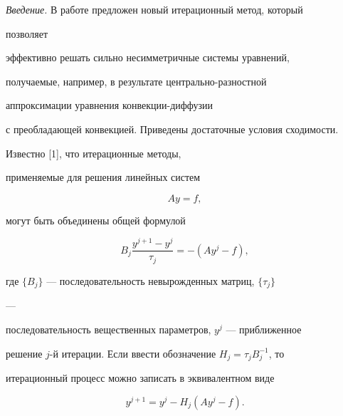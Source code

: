  




\maketitle 


\label{begin} 


 


{\it Введение.} В работе предложен новый итерационный метод, который 


позволяет  


эффективно решать сильно несимметричные системы уравнений, 


получаемые, например, в результате центрально-разностной 


аппроксимации уравнения конвекции-диффузии  


с преобладающей конвекцией. Приведены достаточные условия сходимости. 


 


Известно [1], что итерационные методы, 


применяемые для решения линейных систем 


\begin{equation} 


A y=f, 


\end{equation} 


могут быть объединены общей формулой 


\begin{equation} 


B_j\frac{y^{j+1}-y^j}{\tau_j}=-(A y^j-f), 


\end{equation} 


где $\{B_j\}$ --- последовательность невырожденных матриц, $\{\tau_j\}$ 


--- 


последовательность вещественных параметров, $y^j$ --- приближенное  


решение $j$-й итерации. Если ввести обозначение $H_j=\tau_j B^{-1}_j$, то 


итерационный процесс можно записать в эквивалентном виде 


$$ 


y^{j+1}=y^j-H_j(A y^j-f). 


$$ 


